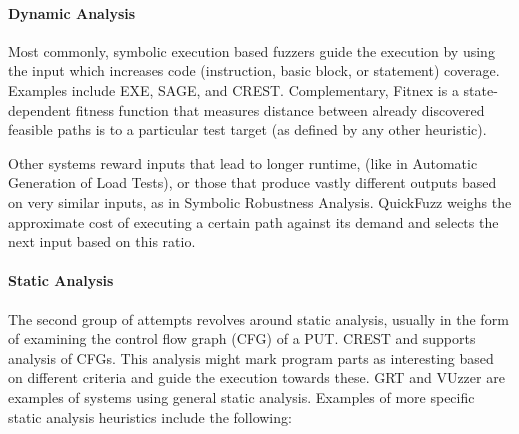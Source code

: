 \documentclass{article}
\begin{document}
\begin{multicols}{2}
  \paragraph{Dynamic Analysis} Most commonly, symbolic execution based fuzzers guide the execution by using the input which increases code (instruction, basic block, or statement) coverage. Examples include EXE\cite{EXE}, SAGE\cite{SAGE}, and CREST\cite{CREST}. Complementary, Fitnex\cite{Fitnex} is a state-dependent fitness function that measures distance between already discovered feasible paths is to a particular test target (as defined by any other heuristic).

  Other systems reward inputs that lead to longer runtime, (like in Automatic Generation of Load Tests\cite{AGLT}), or those that produce vastly different outputs based on very similar inputs, as in Symbolic Robustness Analysis\cite{SRA}. QuickFuzz\cite{QuickFuzz} weighs the approximate cost of executing a certain path against its demand and selects the next input based on this ratio.

  \paragraph{Static Analysis} The second group of attempts revolves around static analysis, usually in the form of examining the control flow graph (CFG) of a PUT. CREST\cite{CREST} \cite{ReviewThreeDecades} and supports analysis of CFGs. This analysis might mark program parts as interesting based on different criteria and guide the execution towards these. GRT\cite{GRT} and VUzzer\cite{VUzzer} are examples of systems using general static analysis. Examples of more specific static analysis heuristics include the following:


\end{multicols}
\end{document}
